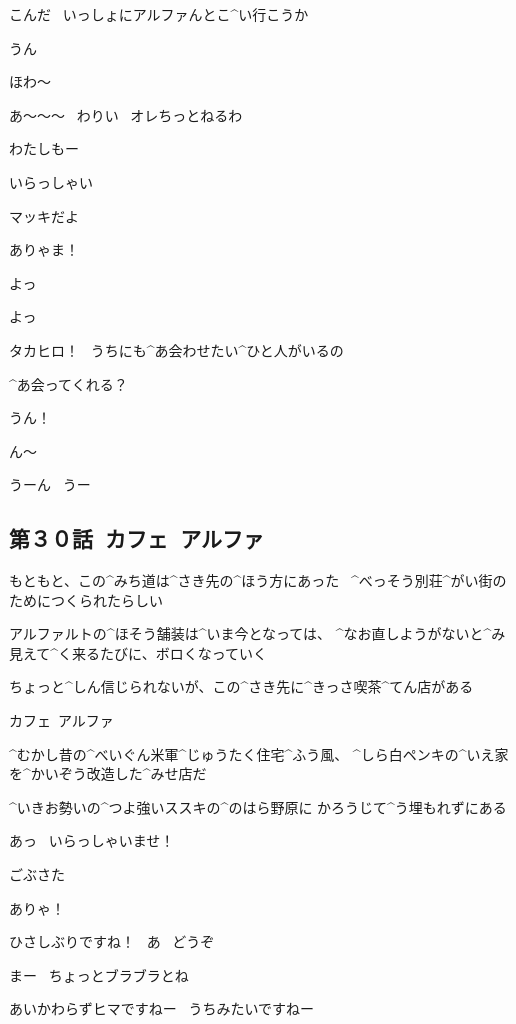 \Takahiro こんだ
\ いっしょにアルファんとこ^{い}{行}こうか

\Makki うん

\page[89]
\Takahiro ほわ〜

\Takahiro あ〜〜〜
\ わりい
\ オレちっとねるわ

\Makki わたしもー

\page[90]
\Alpha いらっしゃい

\page[91]
\Takahiro マッキだよ

\Alpha ありゃま！

\Alpha よっ

\Makki よっ

\Alpha タカヒロ！
\ うちにも^{あ}{会}わせたい^{ひと}{人}がいるの

\Alpha ^{あ}{会}ってくれる？

\Takahiro うん！

\page[92]
\Takahiro ん〜

\Takahiro うーん
\ うー


\subsection{第３０話\ カフェ\ アルファ}

\page[94]
\Narrator もともと、この^{みち}{道}は^{さき}{先}の^{ほう}{方}にあった
\ ^{べっそう}{別荘}^{がい}{街}のためにつくられたらしい

\page[95]
\Narrator アルファルトの^{ほそう}{舗装}は^{いま}{今}となっては、
^{なお}{直}しようがないと^{み}{見}えて^{く}{来}るたびに、ボロくなっていく

\page[96]
\Narrator ちょっと^{しん}{信}じられないが、この^{さき}{先}に^{きっさ}{喫茶}^{てん}{店}がある

\Narrator カフェ\ アルファ

\Narrator ^{むかし}{昔}の^{べいぐん}{米軍}^{じゅうたく}{住宅}^{ふう}{風}、
^{しら}{白}ペンキの^{いえ}{家}を^{かいぞう}{改造}した^{みせ}{店}だ

\page[97]
\Narrator ^{いきお}{勢}いの^{つよ}{強}いススキの^{のはら}{野原}に
かろうじて^{う}{埋}もれずにある

\page[98]
\Alpha あっ
\ いらっしゃいませ！

\Narrator ごぶさた

\page[99]
\Alpha ありゃ！

\Alpha ひさしぶりですね！
\ あ
\ どうぞ

\Narrator まー
\ ちょっとブラブラとね

\Alpha あいかわらずヒマですねー
\ うちみたいですねー


